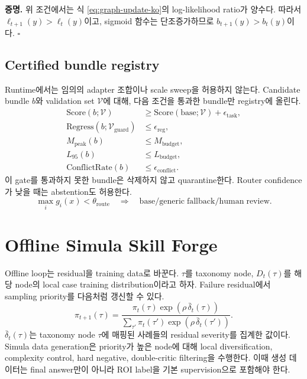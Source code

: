 \documentclass[11pt]{article}
\theoremstyle{definition}
\begin{document}
\noindent\textbf{증명.}
위 조건에서는 식 \ref{eq:graph-update-ko}의 log-likelihood ratio가 양수다.
따라서 $\ell_{t+1}(y)>\ell_t(y)$이고, sigmoid 함수는 단조증가하므로 $b_{t+1}(y)>b_t(y)$이다.
\hfill$\square$

\subsection{Certified bundle registry}

Runtime에서는 임의의 adapter 조합이나 scale sweep을 허용하지 않는다.
Candidate bundle $b$와 validation set $\mathcal{V}$에 대해, 다음 조건을 통과한 bundle만 registry에 올린다.
\begin{align}
  \mathrm{Score}(b;\mathcal{V}) &\ge \mathrm{Score}(\mathrm{base};\mathcal{V})+\epsilon_{\mathrm{task}},\\
  \mathrm{Regress}(b;\mathcal{V}_{\mathrm{guard}}) &\le \epsilon_{\mathrm{reg}},\\
  M_{\mathrm{peak}}(b) &\le M_{\mathrm{budget}},\\
  L_{95}(b) &\le L_{\mathrm{budget}},\\
  \mathrm{ConflictRate}(b) &\le \epsilon_{\mathrm{conflict}}.
\end{align}
이 gate를 통과하지 못한 bundle은 삭제하지 않고 quarantine한다.
Router confidence가 낮을 때는 abstention도 허용한다.
\begin{equation}
  \max_i g_i(x)<\theta_{\mathrm{route}}
  \quad\Rightarrow\quad
  \mathrm{base/generic\;fallback/human\;review}.
\end{equation}

\section{Offline Simula Skill Forge}

Offline loop는 residual을 training data로 바꾼다.
$\tau$를 taxonomy node, $D_t(\tau)$를 해당 node의 local case training distribution이라고 하자.
Failure residual에서 sampling priority를 다음처럼 갱신할 수 있다.
\begin{equation}
  \pi_{t+1}(\tau)
  =
  \frac{
  \pi_t(\tau)\exp(\rho\,\bar\delta_t(\tau))
  }{
  \sum_{\tau'}\pi_t(\tau')\exp(\rho\,\bar\delta_t(\tau'))
  }.
  \label{eq:curriculum-ko}
\end{equation}
$\bar\delta_t(\tau)$는 taxonomy node $\tau$에 매핑된 사례들의 residual severity를 집계한 값이다.
Simula data generation은 priority가 높은 node에 대해 local diversification, complexity control, hard negative, double-critic filtering을 수행한다.
이때 생성 데이터는 final answer만이 아니라 ROI label을 기본 supervision으로 포함해야 한다.
\end{document}
